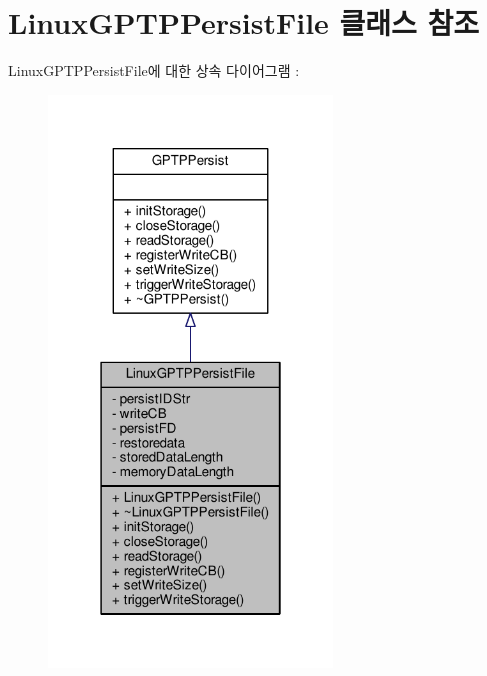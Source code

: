\hypertarget{class_linux_g_p_t_p_persist_file}{}\section{Linux\+G\+P\+T\+P\+Persist\+File 클래스 참조}
\label{class_linux_g_p_t_p_persist_file}


Linux\+G\+P\+T\+P\+Persist\+File에 대한 상속 다이어그램 \+: 
\nopagebreak
\begin{figure}[H]
\begin{center}
\leavevmode
\includegraphics[width=214pt]{class_linux_g_p_t_p_persist_file__inherit__graph}
\end{center}
\end{figure}


